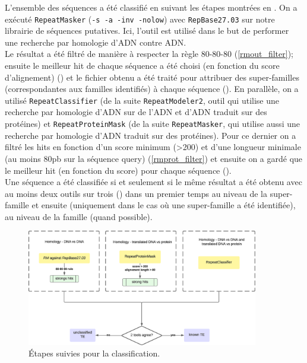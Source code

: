 \documentclass[10pt]{article}
\begin{document}
L'ensemble des séquences a été classifié en suivant les étapes montrées en \figureautorefname{ \ref{fig:classif}}. On a exécuté \texttt{RepeatMasker} (\texttt{-s -a -inv -nolow}) avec \texttt{RepBase27.03} sur notre librairie de séquences putatives. Ici, l'outil est utilisé dans le but de performer une recherche par homologie d'ADN contre ADN. \\
Le résultat a été filtré de manière à respecter la règle 80-80-80 (\autoref{rmout_filter}); ensuite le meilleur hit de chaque séquence a été choisi (en fonction du score d'alignement) (\linkautorefname{\ref{link5}}) et le fichier obtenu a été traité pour attribuer des super-familles (correspondantes aux familles identifiés) à chaque séquence (\linkautorefname{\ref{link6}}). En parallèle, on a utilisé \texttt{RepeatClassifier} (de la suite \texttt{RepeatModeler2}, outil qui utilise une recherche par homologie d'ADN sur de l'ADN et d'ADN traduit sur des protéines) et \texttt{RepeatProteinMask} (de la suite \texttt{RepeatMasker}, qui utilise aussi une recherche par homologie d'ADN traduit sur des protéines). Pour ce dernier on a filtré les hits en fonction d'un score minimum (>200) et d'une longueur minimale (au moins 80pb sur la séquence query) (\autoref{rmprot_filter}) et ensuite on a gardé que le meilleur hit (en fonction du score) pour chaque séquence (\linkautorefname{\ref{link5}}). \\
Une séquence a été classifiée si et seulement si le même résultat a été obtenu avec au moins deux outils sur trois (\linkautorefname{\ref{link7}}) dans un premier temps au niveau de la super-famille et ensuite (uniquement dans le cas où une super-famille a été identifiée), au niveau de la famille (quand possible). \\

\bigskip

\begin{figure}[H]
    \centering
    \includegraphics[width=0.9\textwidth]{img/misc/classif.eps}
    \caption{\'Etapes suivies pour la classification.}
    \label{fig:classif}
\end{figure}
\end{document}
